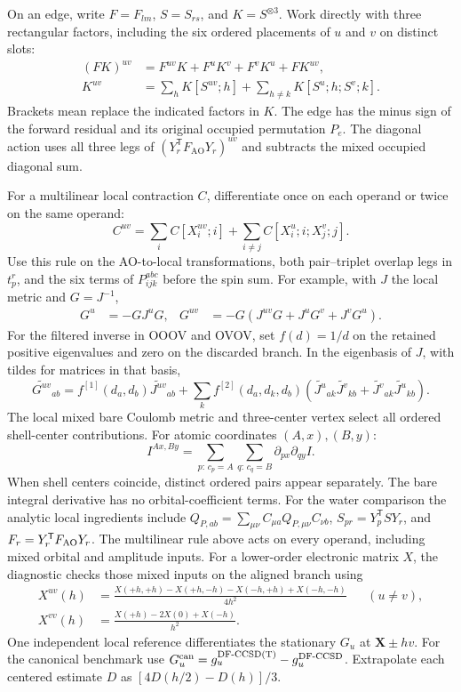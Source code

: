 \documentclass[11pt]{article}
\begin{document}
On an edge, write $F=F_{lm}$, $S=S_{rs}$, and $K=S^{\otimes3}$.
Work directly with three rectangular factors, including the six ordered
placements of $u$ and $v$ on distinct slots:
\begin{align}
 (FK)^{uv} &= F^{uv}K+F^u K^v+F^v K^u+F K^{uv},\\
 K^{uv} &= \sum_h K[S^{uv};h]+\sum_{h\ne k}K[S^u;h;S^v;k].
\end{align}
Brackets mean replace the indicated factors in $K$. The edge has the minus
sign of the forward residual and its original occupied permutation $P_e$.
The diagonal action uses all three legs of $(Y_r^{\mathsf T}F_{\mathrm{AO}}Y_r)^{uv}$
and subtracts the mixed occupied diagonal sum.

For a multilinear local contraction $C$, differentiate once on each operand
or twice on the same operand:
\begin{equation}
 C^{uv}=\sum_i C[ X_i^{uv};i]+\sum_{i\ne j}C[X_i^u;i;X_j^v;j].
\end{equation}
Use this rule on the AO-to-local transformations, both pair--triplet overlap
legs in $t_p^r$, and the six terms of $P_{ijk}^{abc}$ before the spin sum.
For example, with $J$ the local metric and $G=J^{-1}$,
\begin{align}
 G^u &=-GJ^uG, &
 G^{uv}&=-G(J^{uv}G+J^uG^v+J^vG^u).
\end{align}
For the filtered inverse in OOOV and OVOV, set $f(d)=1/d$ on the retained
positive eigenvalues and zero on the discarded branch. In the eigenbasis
of $J$, with tildes for matrices in that basis,
\begin{equation}
 \widetilde{G^{uv}}_{ab}
 = f^{[1]}(d_a,d_b)\widetilde{J^{uv}}_{ab}
 +\sum_k f^{[2]}(d_a,d_k,d_b)
 (\widetilde{J^u}_{ak}\widetilde{J^v}_{kb}
 +\widetilde{J^v}_{ak}\widetilde{J^u}_{kb}).
\end{equation}
The local mixed bare Coulomb metric and three-center vertex select all
ordered shell-center contributions. For atomic coordinates $(A,x),(B,y)$:
\begin{equation}
 I^{Ax,By}=\sum_{p:\,c_p=A}\sum_{q:\,c_q=B}
             \partial_{p x}\partial_{q y} I .
\end{equation}
When shell centers coincide, distinct ordered pairs appear separately. The
bare integral derivative has no orbital-coefficient terms.
For the water comparison the analytic local ingredients include
$Q_{P,ab}=\sum_{\mu\nu} C_{\mu a}Q_{P,\mu\nu}C_{\nu b}$,
$S_{pr}=Y_p^{\mathsf T}SY_r$, and $F_{r}=Y_r^{\mathsf T}F_{\rm AO}Y_r$.
The multilinear rule above acts on every operand, including mixed orbital
and amplitude inputs. For a lower-order electronic matrix $X$, the diagnostic
checks those mixed inputs on the aligned branch using
\begin{align}
 X^{uv}(h)&=\frac{X(+h,+h)-X(+h,-h)-X(-h,+h)+X(-h,-h)}{4h^2}
             && (u\ne v),\\
 X^{vv}(h)&=\frac{X(+h)-2X(0)+X(-h)}{h^2}.
\end{align}
One independent local reference differentiates the stationary $G_u$ at
$\mathbf X\pm h v$. For the canonical benchmark use
$G_u^{\rm can}=g_u^{\rm DF\text{-}CCSD(T)}-g_u^{\rm DF\text{-}CCSD}$.
Extrapolate each centered estimate $D$ as $[4D(h/2)-D(h)]/3$.
\end{document}
